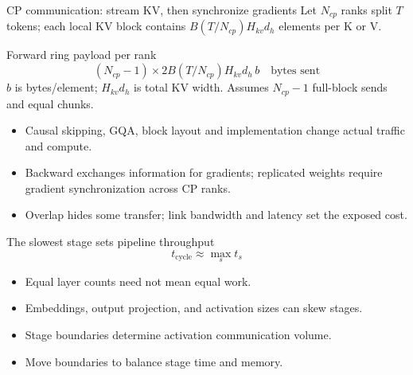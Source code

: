 \documentclass[handout]{beamer}
\begin{document}
\begin{frame}{CP communication: stream KV, then synchronize gradients}
  \small Let $N_{cp}$ ranks split $T$ tokens; each local KV block contains $B(T/N_{cp})H_{kv}d_h$ elements per K or V.
  \begin{block}{Forward ring payload per rank}
    \[
      (N_{cp}-1)\times 2B(T/N_{cp})H_{kv}d_h\,b\quad\text{bytes sent}
    \]
    $b$ is bytes/element; $H_{kv}d_h$ is total KV width. Assumes $N_{cp}-1$ full-block sends and equal chunks.
  \end{block}
  \begin{itemize}
    \item Causal skipping, GQA, block layout and implementation change actual traffic and compute.
    \item Backward exchanges information for gradients; replicated weights require gradient synchronization across CP ranks.
    \item Overlap hides some transfer; link bandwidth and latency set the exposed cost.
  \end{itemize}
\end{frame}

\begin{frame}{The slowest stage sets pipeline throughput}
  \[
    t_{\text{cycle}}\approx\max_s t_s
  \]
  \begin{itemize}
      \setlength{\itemsep}{7pt}
    \item Equal layer counts need not mean equal work.
    \item Embeddings, output projection, and activation sizes can skew stages.
    \item Stage boundaries determine activation communication volume.
    \item Move boundaries to balance stage time and memory.
  \end{itemize}
\end{frame}
\end{document}
